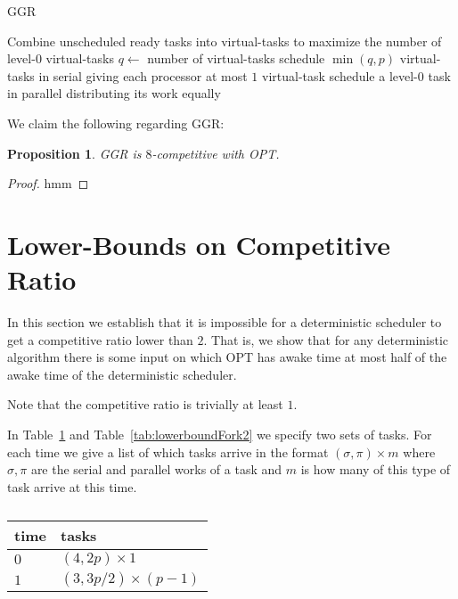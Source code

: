 \documentclass[twocolumn]{article}[10pt]
\newtheorem{proposition}{Proposition}
\begin{document}
\begin{algorithm}
  \caption{GGR}
  \label{alg:ggr}
  \begin{algorithmic}
        \State Combine unscheduled ready tasks into virtual-tasks
        to maximize the number of level-$0$ virtual-tasks
        \State $q \gets $ number of virtual-tasks 
          \State schedule $\min(q, p)$ virtual-tasks in serial
          \State giving each processor at most $1$ virtual-task
        \Else
          \State schedule a level-$0$ task in parallel
          \State distributing its work equally 
        \EndIf
      \EndIf
    \EndWhile
  \end{algorithmic}
\end{algorithm}

We claim the following regarding GGR:
\begin{proposition}
  GGR is $8$-competitive with OPT.
\end{proposition}
\begin{proof}
  hmm
\end{proof}

\section{Lower-Bounds on Competitive Ratio}

In this section we establish that it is impossible for a
deterministic scheduler to get a competitive ratio lower than
$2$. That is, we show that for any deterministic algorithm there
is some input on which OPT has awake time at most half of the
awake time of the deterministic scheduler.

Note that the competitive ratio is trivially at least $1$.

In Table~\ref{tab:lowerboundFork1} and
Table~\ref{tab:lowerboundFork2} we specify two sets of tasks.
For each time we give a list of which tasks arrive in the format
$(\sigma, \pi)\times m$ where $\sigma, \pi$ are the serial and
parallel works of a task and $m$ is how many of this type of task
arrive at this time.

\begin{table}[H]
\caption{}
\label{tab:lowerboundFork1}
\centering
\begin{tabular}{|l|l|}
\hline
time & tasks                    \\ \hline
$0$  & $(4, 2p) \times 1$       \\ \hline
$1$  & $(3, 3p/2) \times (p-1)$ \\ \hline
\end{tabular}
\end{table}
\end{document}
